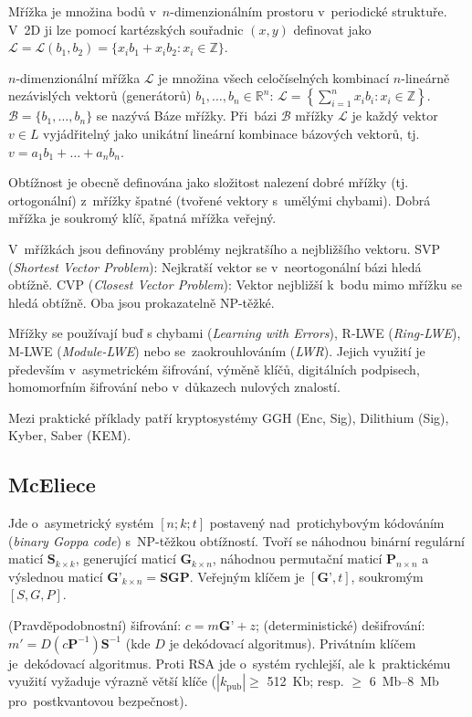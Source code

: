 Mřížka je množina bodů v~$n$-dimenzionálním prostoru v~periodické struktuře.
V~2D ji lze pomocí kartézských souřadnic $(x, y)$ definovat jako
$\mathcal{L} = \mathcal{L}(b_1, b_2) = \{x_i b_1 + x_i b_2 : x_i \in \mathbb{Z}\}$.

$n$-dimenzionální mřížka $\mathcal{L}$ je množina všech celočíselných kombinací $n$-lineárně nezávislých vektorů (generátorů) $b_1, \dots, b_n \in \mathbb{R}^n$:
$\mathcal{L} = \left\{ \sum_{i=1}^n x_i b_i : x_i \in \mathbb{Z} \right\}$.
$\mathcal{B} = \{b_1, \dots, b_n\}$ se nazývá Báze mřížky.
Při~bázi $\mathcal{B}$ mřížky $\mathcal{L}$ je každý vektor $v \in L$ vyjádřitelný jako unikátní lineární kombinace bázových vektorů, tj. $v = a_1 b_1 + \dots + a_n b_n$.

Obtížnost je obecně definována jako složitost nalezení dobré mřížky (tj. ortogonální) z~mřížky špatné (tvořené vektory s~umělými chybami).
Dobrá mřížka je soukromý klíč, špatná mřížka veřejný.

V~mřížkách jsou definovány problémy nejkratšího a nejbližšího vektoru.
SVP (\emph{Shortest Vector Problem}): Nejkratší vektor se v~neortogonální bázi hledá obtížně.
CVP (\emph{Closest Vector Problem}): Vektor nejbližší k~bodu mimo mřížku se hledá obtížně.
Oba jsou prokazatelně NP-těžké.

Mřížky se používají buď s chybami (\emph{Learning with Errors}), R-LWE (\emph{Ring-LWE}), M-LWE (\emph{Module-LWE}) nebo se~zaokrouhlováním (\emph{LWR}).
Jejich využití je především v~asymetrickém šifrování, výměně klíčů, digitálních podpisech, homomorfním šifrování nebo v~důkazech nulových znalostí.

Mezi praktické příklady patří kryptosystémy GGH (Enc, Sig), Dilithium (Sig), Kyber, Saber (KEM).


\subsection{McEliece}

Jde o~asymetrický systém $[n;k;t]$ postavený nad~protichybovým kódováním (\emph{binary Goppa code}) s~NP-těžkou obtížností.
Tvoří se náhodnou binární regulární maticí $\textbf{S}_{k \times k}$, generující maticí $\textbf{G}_{k \times n}$, náhodnou permutační maticí $\textbf{P}_{n \times n}$ a výslednou maticí $\textbf{G'}_{k \times n} = \textbf{SGP}$.
Veřejným klíčem je $[\textbf{G'}, t]$, soukromým $[S, G, P]$.

(Pravděpodobnostní) šifrování: $c = m\textbf{G'} + z$; (deterministické) dešifrování: $m' = D(c\textbf{P}^{-1})\textbf{S}^{-1}$ (kde $D$ je dekódovací algoritmus).
Privátním klíčem je~dekódovací algoritmus.
Proti RSA jde o~systém rychlejší, ale k~praktickému využití vyžaduje výrazně větší klíče ($| k_\text{pub} | \geq$ 512~Kb; resp. $\geq$ 6~Mb--8~Mb pro~postkvantovou bezpečnost).


